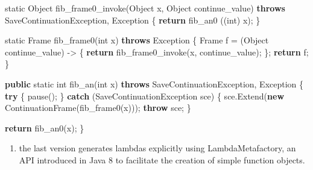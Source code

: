 \documentclass[12pt,a4paper,oneside,openright]{book}
\newenvironment{Shaded}{\begin{snugshade}}{\end{snugshade}}
\newcommand{\KeywordTok}[1]{\textcolor[rgb]{0.13,0.29,0.53}{\textbf{{#1}}}}
\newcommand{\DataTypeTok}[1]{\textcolor[rgb]{0.13,0.29,0.53}{{#1}}}
\newcommand{\FunctionTok}[1]{\textcolor[rgb]{0.00,0.00,0.00}{{#1}}}
\newcommand{\NormalTok}[1]{{#1}}
\providecommand{\tightlist}{%
  \setlength{\itemsep}{0pt}\setlength{\parskip}{0pt}}
\begin{document}
\begin{Shaded}
\begin{Highlighting}[]
    \DataTypeTok{static} \NormalTok{Object }\FunctionTok{fib_frame0_invoke}\NormalTok{(Object x, Object continue_value)}
            \KeywordTok{throws} \NormalTok{SaveContinuationException, Exception \{}
         \KeywordTok{return} \FunctionTok{fib_an0} \NormalTok{((}\DataTypeTok{int}\NormalTok{) x);}
    \NormalTok{\}}

    \DataTypeTok{static} \NormalTok{Frame }\FunctionTok{fib_frame0}\NormalTok{(}\DataTypeTok{int} \NormalTok{x)}
            \KeywordTok{throws} \NormalTok{Exception \{}
        \NormalTok{Frame f = (Object continue_value)}
                   \NormalTok{-> \{}
                        \KeywordTok{return} \FunctionTok{fib_frame0_invoke}\NormalTok{(x, continue_value);}
                      \NormalTok{\};}
        \KeywordTok{return} \NormalTok{f;}
    \NormalTok{\}}

    \KeywordTok{public} \DataTypeTok{static} \DataTypeTok{int} \FunctionTok{fib_an}\NormalTok{(}\DataTypeTok{int} \NormalTok{x)}
            \KeywordTok{throws} \NormalTok{SaveContinuationException, Exception \{}
        \KeywordTok{try} \NormalTok{\{}
            \FunctionTok{pause}\NormalTok{();}
        \NormalTok{\} }\KeywordTok{catch} \NormalTok{(SaveContinuationException sce) \{}
            \NormalTok{sce.}\FunctionTok{Extend}\NormalTok{(}\KeywordTok{new} \FunctionTok{ContinuationFrame}\NormalTok{(}\FunctionTok{fib_frame0}\NormalTok{(x)));}
            \KeywordTok{throw} \NormalTok{sce;}
        \NormalTok{\}}

        \KeywordTok{return} \FunctionTok{fib_an0}\NormalTok{(x);}
    \NormalTok{\}}
\end{Highlighting}
\end{Shaded}

\begin{enumerate}
\def\labelenumi{\arabic{enumi}.}
\setcounter{enumi}{3}
\tightlist
\item
  the last version generates lambdas explicitly using LambdaMetafactory,
  an API introduced in Java 8 to facilitate the creation of simple
  function objects.
\end{enumerate}
\end{document}
